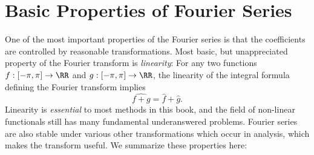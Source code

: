 \section{Basic Properties of Fourier Series}

One of the most important properties of the Fourier series is that the coefficients are controlled by reasonable transformations. Most basic, but unappreciated property of the Fourier transform is \emph{linearity}: For any two functions $f: [-\pi,\pi] \to \RR$ and $g: [-\pi,\pi] \to \RR$, the linearity of the integral formula defining the Fourier transform implies
%
\[ \widehat{f+g} = \widehat{f} + \widehat{g}. \]
%
Linearity is \emph{essential} to most methods in this book, and the field of non-linear functionals still has many fundamental underanswered problems. Fourier series are also stable under various other transformations which occur in analysis, which makes the transform useful. We summarize these properties here:
%
